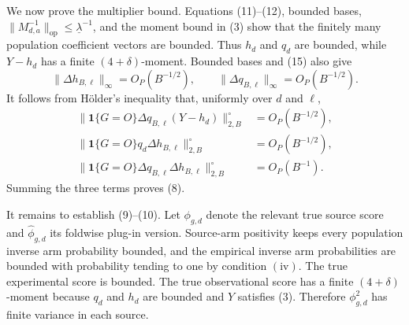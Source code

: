 We now prove the multiplier bound.  Equations (11)--(12), bounded bases, \(\|M_{d,a}^{-1}\|_{\mathrm{op}}\le\underline\lambda^{-1}\), and the moment bound in (3) show that the finitely many population coefficient vectors are bounded.  Thus \(h_d\) and \(q_d\) are bounded, while \(Y-h_d\) has a finite \((4+\delta)\)-moment.  Bounded bases and (15) also give
\[
 \|\Delta h_{B,\ell}\|_\infty=O_P(B^{-1/2}),
 \qquad
 \|\Delta q_{B,\ell}\|_\infty=O_P(B^{-1/2}).            \tag{18}
\]
It follows from H\"older's inequality that, uniformly over \(d\) and \(\ell\),
\[
\begin{aligned}
 \|\mathbf 1\{G=O\}\Delta q_{B,\ell}(Y-h_d)\|_{2,B}^{\circ}
 &=O_P(B^{-1/2}),\\
 \|\mathbf 1\{G=O\}q_d\Delta h_{B,\ell}\|_{2,B}^{\circ}
 &=O_P(B^{-1/2}),\\
 \|\mathbf 1\{G=O\}\Delta q_{B,\ell}\Delta h_{B,\ell}\|_{2,B}^{\circ}
 &=O_P(B^{-1}).                                           \tag{19}
\end{aligned}
\]
Summing the three terms proves (8).

It remains to establish (9)--(10).  Let \(\phi_{g,d}\) denote the relevant true source score and \(\widehat\phi_{g,d}\) its foldwise plug-in version.  Source-arm positivity keeps every population inverse arm probability bounded, and the empirical inverse arm probabilities are bounded with probability tending to one by condition \(\mathrm{(iv)}\).  The true experimental score is bounded.  The true observational score has a finite \((4+\delta)\)-moment because \(q_d\) and \(h_d\) are bounded and \(Y\) satisfies (3).  Therefore \(\phi_{g,d}^2\) has finite variance in each source.

